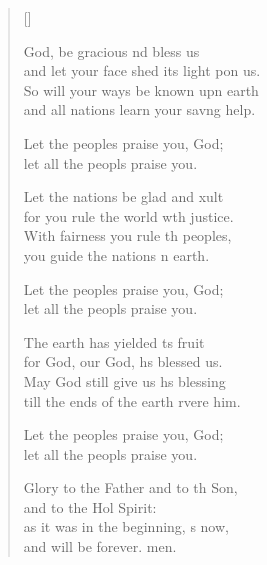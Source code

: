\settowidth{\versewidth}{and let your face shed its light upon us.}
\begin{verse}[\versewidth]
  \begin{patverse}
 God, be gracious nd bless us\Med\\
and let your face shed its light pon us.\\
So will your ways be known upn earth\Med\\
and all nations learn your sav\pointup{\i}ng help.

Let the peoples praise you,  God;\Med\\
let all the peopls praise you.

Let the nations be glad and xult\Med\\
for you rule the world w\pointup{\i}th justice.\\
With fairness you rule th peoples,\Med\\
you guide the nations n earth.

Let the peoples praise you,  God;\Med\\
let all the peopls praise you.

The earth has yielded \pointup{\i}ts fruit\Med\\
for God, our God, hs blessed us.\\
May God still give us h\pointup{\i}s blessing\Med\\
till the ends of the earth rvere him.

Let the peoples praise you,  God;\Med\\
let all the peopls praise you.

Glory to the Father and to th Son,\Med\\
and to the Hol Spirit:\\
as it was in the beginning, \pointup{\i}s now,\Med\\
and will be forever. men.
  \end{patverse}
\end{verse}
